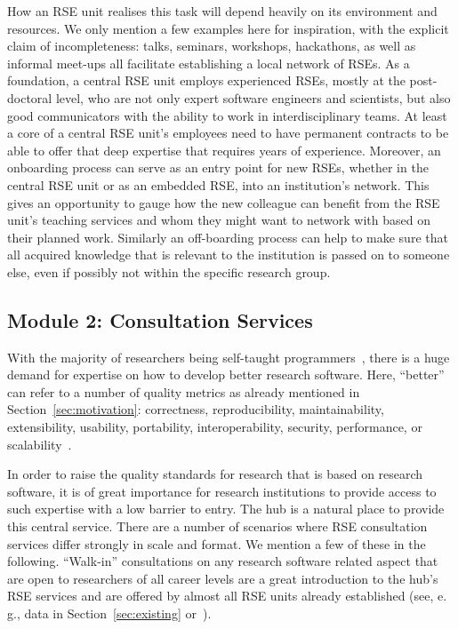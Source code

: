 \documentclass[10pt,letterpaper]{article}
\newcommand*{\eg}{e.\,g.,\xspace}
\begin{document}
How an RSE unit realises this task will depend heavily on its environment and resources.
We only mention a few examples here for inspiration, with the explicit claim of incompleteness:
talks, seminars, workshops, hackathons, as well as informal meet-ups all facilitate establishing a local network of RSEs.
As a foundation, a central RSE unit employs experienced RSEs, mostly at the post-doctoral level, who are not only expert software engineers and scientists, but also good communicators with the ability to work in interdisciplinary teams.
At least a core of a central RSE unit's employees need to have permanent contracts to be able to offer that deep expertise that requires years of experience.
Moreover, an onboarding process can serve as an entry point for new RSEs, whether in the central RSE unit or as an embedded RSE, into an institution's network.
This gives an opportunity to gauge how the new colleague can benefit from the RSE unit's teaching services and whom they might want to network with based on their planned work.
Similarly an off-boarding process can help to make sure that all acquired knowledge that is relevant to the institution is passed on to someone else, even if possibly not within the specific research group.

\subsection*{Module 2: Consultation Services}%
\label{sec:consultation}

With the majority of researchers being self-taught programmers~\cite{Carver2013}, there is a huge demand for expertise on how to develop better research software.
Here, “better” can refer to a number of quality metrics as already mentioned in Section~\ref{sec:motivation}: correctness, reproducibility, maintainability, extensibility, usability, portability, interoperability, security, performance, or scalability~\cite[Chapter 16]{Schulmeyer2008}.

In order to raise the quality standards for research that is based on research software, it is of great importance for research institutions to provide access to such expertise with a low barrier to entry.
The hub is a natural place to provide this central service.
There are a number of scenarios where RSE consultation services differ strongly in scale and format.
We mention a few of these in the following.
“Walk-in” consultations on any research software related aspect that are open to researchers of all career levels are a great introduction to the hub's RSE services and are offered by almost all RSE units already established (see, \eg{} data in Section~\ref{sec:existing} or~\cite{Katz2019}).
\end{document}
